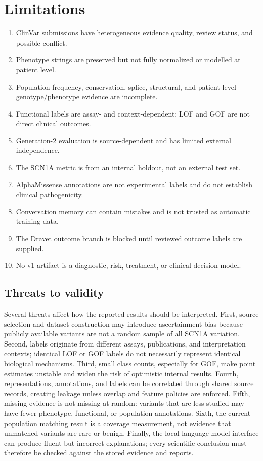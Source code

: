 \documentclass[12pt,a4paper]{article}
\begin{document}
\section{Limitations}
\begin{enumerate}
\item ClinVar submissions have heterogeneous evidence quality, review status, and possible conflict.
\item Phenotype strings are preserved but not fully normalized or modelled at patient level.
\item Population frequency, conservation, splice, structural, and patient-level genotype/phenotype evidence are incomplete.
\item Functional labels are assay- and context-dependent; LOF and GOF are not direct clinical outcomes.
\item Generation-2 evaluation is source-dependent and has limited external independence.
\item The SCN1A metric is from an internal holdout, not an external test set.
\item AlphaMissense annotations are not experimental labels and do not establish clinical pathogenicity.
\item Conversation memory can contain mistakes and is not trusted as automatic training data.
\item The Dravet outcome branch is blocked until reviewed outcome labels are supplied.
\item No v1 artifact is a diagnostic, risk, treatment, or clinical decision model.
\end{enumerate}

\subsection{Threats to validity}
Several threats affect how the reported results should be interpreted. First, source selection and dataset construction may introduce ascertainment bias because publicly available variants are not a random sample of all SCN1A variation. Second, labels originate from different assays, publications, and interpretation contexts; identical LOF or GOF labels do not necessarily represent identical biological mechanisms. Third, small class counts, especially for GOF, make point estimates unstable and widen the risk of optimistic internal results. Fourth, representations, annotations, and labels can be correlated through shared source records, creating leakage unless overlap and feature policies are enforced. Fifth, missing evidence is not missing at random: variants that are less studied may have fewer phenotype, functional, or population annotations. Sixth, the current population matching result is a coverage measurement, not evidence that unmatched variants are rare or benign. Finally, the local language-model interface can produce fluent but incorrect explanations; every scientific conclusion must therefore be checked against the stored evidence and reports.
\end{document}
